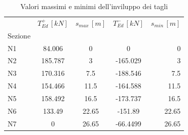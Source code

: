 \begin{table}
  	\centering
  	\caption{Valori massimi e minimi dell'inviluppo dei tagli}
  	\label{tab:shearEnvelope_sleRara}
  	\begin{tabular}{lcccr}
		\toprule
		& $T_{Ed}^+\,[kN]$ & $s_{max}\,[m]$ & $T_{Ed}^-\,[kN]$ & $s_{min}\,[m]$ \\
		Sezione &             &          &             &          \\
		\midrule
N1      &    84.006 &        0 &         0 &        0 \\
N2      &   185.787 &        3 &  -165.029 &        3 \\
N3      &   170.316 &      7.5 &  -188.546 &      7.5 \\
N4      &   154.466 &     11.5 &  -164.588 &     11.5 \\
N5      &   158.492 &     16.5 &  -173.737 &     16.5 \\
N6      &    133.49 &    22.65 &   -151.89 &    22.65 \\
N7      &         0 &    26.65 &  -66.4499 &    26.65 \\
		\bottomrule
	\end{tabular}
  \end{table}

\cleardoublepage

